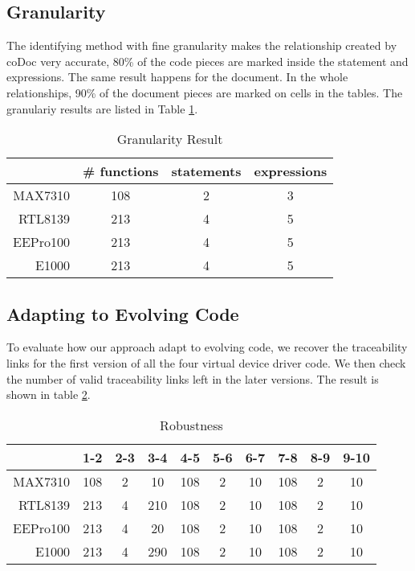 \subsection{Granularity}

The identifying method with fine granularity makes the relationship created by coDoc very accurate,
80\% of the code pieces are marked inside the statement and expressions.
The same result happens for the document.
In the whole relationships,
90\% of the document pieces are marked on cells in the tables.
The granulariy results are listed in Table \ref{table:granularity}.

\begin{table}[th]
\caption{Granularity Result}
\centering
\begin{tabular*}{0.6\textwidth}{@{\extracolsep{\fill}}rccc}
\hline
 & \# functions & statements & expressions \\
\hline
MAX7310 & 108 & 2 & 3\\
RTL8139  & 213 & 4 & 5\\
EEPro100  & 213 & 4 & 5\\
E1000  & 213 & 4 & 5\\
\hline
\end{tabular*}
\label{table:granularity}
\end{table}


\subsection{Adapting to Evolving Code}

To evaluate how our approach adapt to evolving code, we recover the traceability links for the first version of all the four virtual device driver code.
We then check the number of valid traceability links left in the later versions. The result is shown in table \ref{table:robust}.

\begin{table}[th]
\caption{Robustness}
\centering
\begin{tabular*}{0.9\textwidth}{@{\extracolsep{\fill}}rccccccccc}
\hline
 & 1-2 & 2-3 & 3-4 & 4-5 & 5-6 & 6-7 & 7-8 & 8-9 & 9-10 \\
\hline
MAX7310 & 108 & 2 & 10 & 108 & 2 & 10 & 108 & 2 & 10\\
RTL8139  & 213 & 4 & 210 & 108 & 2 & 10 & 108 & 2 & 10\\
EEPro100  & 213 & 4 & 20 & 108 & 2 & 10 & 108 & 2 & 10\\
E1000  & 213 & 4 & 290 & 108 & 2 & 10 & 108 & 2 & 10\\
\hline
\end{tabular*}
\label{table:robust}
\end{table}

